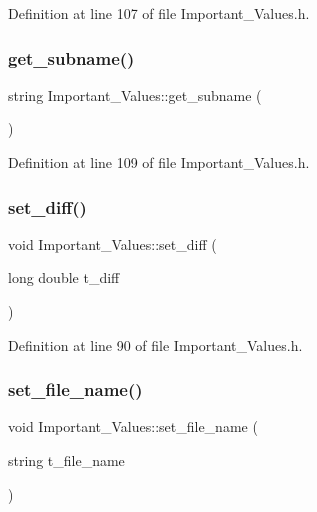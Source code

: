 Definition at line 107 of file Important\+\_\+\+Values.\+h.

\mbox{\label{class_important___values_a2c64f61fe5934d21bb9f86411573957c}} 
\subsubsection{\texorpdfstring{get\_subname()}{get\_subname()}}
{\footnotesize\ttfamily string Important\+\_\+\+Values\+::get\+\_\+subname (\begin{DoxyParamCaption}{ }\end{DoxyParamCaption})\hspace{0.3cm}{\ttfamily [inline]}}



Definition at line 109 of file Important\+\_\+\+Values.\+h.

\mbox{\label{class_important___values_ab2cbeb82a9612d95ee2e911c4ddde6e8}} 
\subsubsection{\texorpdfstring{set\_diff()}{set\_diff()}}
{\footnotesize\ttfamily void Important\+\_\+\+Values\+::set\+\_\+diff (\begin{DoxyParamCaption}\item[{long double}]{t\+\_\+diff }\end{DoxyParamCaption})\hspace{0.3cm}{\ttfamily [inline]}}



Definition at line 90 of file Important\+\_\+\+Values.\+h.

\mbox{\label{class_important___values_a342e5dd488c2082dcdad69e68b9c5043}} 
\subsubsection{\texorpdfstring{set\_file\_name()}{set\_file\_name()}}
{\footnotesize\ttfamily void Important\+\_\+\+Values\+::set\+\_\+file\+\_\+name (\begin{DoxyParamCaption}\item[{string}]{t\+\_\+file\+\_\+name }\end{DoxyParamCaption})\hspace{0.3cm}{\ttfamily [inline]}}



